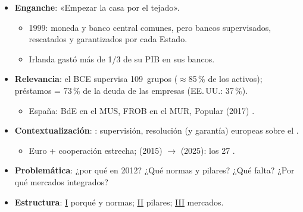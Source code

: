 \documentclass{article}
\begin{document}
\cabecerarepaso
\begin{columnas}

\begin{itemize}
\item \textbf{Enganche}: «Empezar la casa por el tejado».
  \begin{itemize}
  \item 1999: moneda y banco central comunes, pero bancos supervisados, rescatados y garantizados por cada Estado.
  \item Irlanda gastó más de 1/3 de su PIB en sus bancos.
  \end{itemize}
\item \textbf{Relevancia}: el BCE supervisa 109~grupos ($\approx$85\,\% de los activos); préstamos = 73\,\% de la deuda de las empresas (EE.\,UU.: 37\,\%).
  \begin{itemize}
  \item España: BdE en el MUS, FROB en el MUR, Popular (2017)  .
  \end{itemize}
\item \textbf{Contextualización}: : supervisión, resolución (y garantía) europeas sobre el .
  \begin{itemize}
  \item Euro + cooperación estrecha;  (2015) $\to$  (2025): los 27  .
  \end{itemize}
\item \textbf{Problemática}: ¿por qué en 2012? ¿Qué normas y pilares? ¿Qué falta? ¿Por qué mercados integrados?
\item \textbf{Estructura}: \hyperref[rep:I]{I} porqué y normas; \hyperref[rep:II]{II} pilares; \hyperref[rep:III]{III} mercados.
\end{itemize}


\end{columnas}
\end{document}
